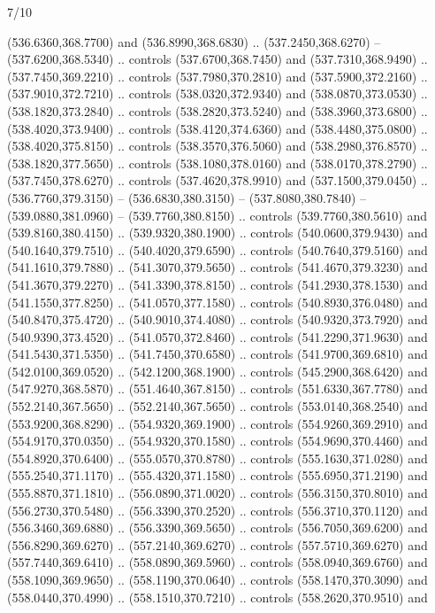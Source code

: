 \begin{flagdescription}{7/10}
\begin{scope}[xshift=0.5\flaglength]
\begin{scope}[scale=0.00185\flagwidth,yshift=245mm,xshift=-43.7mm]
\begin{scope}[y=-0.8pt, x=0.8pt, inner sep=0pt, outer sep=0pt]
\begin{scope}[shift={(0,0)},shift={(0,36.591)}]
\begin{scope}[shift={(-344.0678,183.89831)}]
  (536.6360,368.7700) and (536.8990,368.6830) .. (537.2450,368.6270) --
  (537.6200,368.5340) .. controls (537.6700,368.7450) and (537.7310,368.9490) ..
  (537.7450,369.2210) .. controls (537.7980,370.2810) and (537.5900,372.2160) ..
  (537.9010,372.7210) .. controls (538.0320,372.9340) and (538.0870,373.0530) ..
  (538.1820,373.2840) .. controls (538.2820,373.5240) and (538.3960,373.6800) ..
  (538.4020,373.9400) .. controls (538.4120,374.6360) and (538.4480,375.0800) ..
  (538.4020,375.8150) .. controls (538.3570,376.5060) and (538.2980,376.8570) ..
  (538.1820,377.5650) .. controls (538.1080,378.0160) and (538.0170,378.2790) ..
  (537.7450,378.6270) .. controls (537.4620,378.9910) and (537.1500,379.0450) ..
  (536.7760,379.3150) -- (536.6830,380.3150) -- (537.8080,380.7840) --
  (539.0880,381.0960) -- (539.7760,380.8150) .. controls (539.7760,380.5610) and
  (539.8160,380.4150) .. (539.9320,380.1900) .. controls (540.0600,379.9430) and
  (540.1640,379.7510) .. (540.4020,379.6590) .. controls (540.7640,379.5160) and
  (541.1610,379.7880) .. (541.3070,379.5650) .. controls (541.4670,379.3230) and
  (541.3670,379.2270) .. (541.3390,378.8150) .. controls (541.2930,378.1530) and
  (541.1550,377.8250) .. (541.0570,377.1580) .. controls (540.8930,376.0480) and
  (540.8470,375.4720) .. (540.9010,374.4080) .. controls (540.9320,373.7920) and
  (540.9390,373.4520) .. (541.0570,372.8460) .. controls (541.2290,371.9630) and
  (541.5430,371.5350) .. (541.7450,370.6580) .. controls (541.9700,369.6810) and
  (542.0100,369.0520) .. (542.1200,368.1900) .. controls (545.2900,368.6420) and
  (547.9270,368.5870) .. (551.4640,367.8150) .. controls (551.6330,367.7780) and
  (552.2140,367.5650) .. (552.2140,367.5650) .. controls (553.0140,368.2540) and
  (553.9200,368.8290) .. (554.9320,369.1900) .. controls (554.9260,369.2910) and
  (554.9170,370.0350) .. (554.9320,370.1580) .. controls (554.9690,370.4460) and
  (554.8920,370.6400) .. (555.0570,370.8780) .. controls (555.1630,371.0280) and
  (555.2540,371.1170) .. (555.4320,371.1580) .. controls (555.6950,371.2190) and
  (555.8870,371.1810) .. (556.0890,371.0020) .. controls (556.3150,370.8010) and
  (556.2730,370.5480) .. (556.3390,370.2520) .. controls (556.3710,370.1120) and
  (556.3460,369.6880) .. (556.3390,369.5650) .. controls (556.7050,369.6200) and
  (556.8290,369.6270) .. (557.2140,369.6270) .. controls (557.5710,369.6270) and
  (557.7440,369.6410) .. (558.0890,369.5960) .. controls (558.0940,369.6760) and
  (558.1090,369.9650) .. (558.1190,370.0640) .. controls (558.1470,370.3090) and
  (558.0440,370.4990) .. (558.1510,370.7210) .. controls (558.2620,370.9510) and

\end{scope}
\end{scope}
\end{scope}
\end{scope}
\end{scope}
\end{flagdescription}
